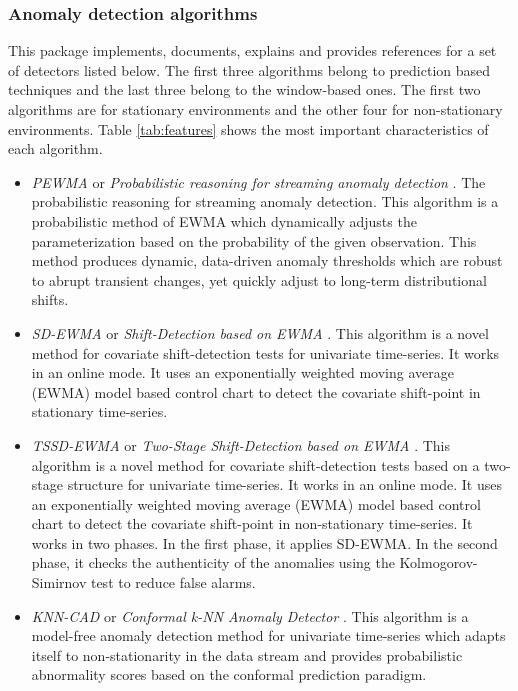 \documentclass[a4paper]{article}\usepackage[]{graphicx}\usepackage[]{color}
\begin{document}
\subsubsection{Anomaly detection algorithms} \label{S:3.1.1}

This package implements, documents, explains and provides references for a set of detectors listed below.  The first three algorithms belong to prediction based techniques and the last three belong to the window-based ones. The first two algorithms are for stationary environments and the other four for non-stationary environments. Table \ref{tab:features} shows the most important characteristics of each algorithm.

\begin{itemize}

\item \emph{PEWMA} or \emph{Probabilistic reasoning for streaming anomaly detection} \cite{pewma}. The probabilistic reasoning for streaming anomaly detection. This algorithm is a probabilistic method of EWMA which dynamically adjusts the parameterization based on the probability of the given observation. This method produces dynamic, data-driven anomaly thresholds which are robust to abrupt transient changes, yet quickly adjust to long-term distributional shifts.

\item \emph{SD-EWMA} or \emph{Shift-Detection based on EWMA} \cite{Raza}. This algorithm is a novel method for covariate shift-detection tests for univariate time-series. It works in an online mode. It uses an exponentially weighted moving average (EWMA) model based control chart to detect the covariate shift-point in stationary time-series.

\item \emph{TSSD-EWMA} or \emph{Two-Stage Shift-Detection based on EWMA} \cite{Raza}. This algorithm is a novel method for covariate shift-detection tests based on a two-stage structure for univariate time-series. It works in an online mode. It uses an exponentially weighted moving average (EWMA) model based control chart to detect the covariate shift-point in non-stationary time-series. It works in two phases. In the first phase, it applies SD-EWMA. In the second phase, it checks the authenticity of the anomalies using the Kolmogorov-Simirnov test to reduce false alarms.

\item \emph{KNN-CAD} or \emph{Conformal k-NN Anomaly Detector} \cite{2016arXiv160804585B}. This algorithm is a model-free anomaly detection method for univariate time-series which adapts itself to non-stationarity in the data stream and provides probabilistic abnormality scores based on the conformal prediction paradigm.


\end{itemize}
\end{document}
